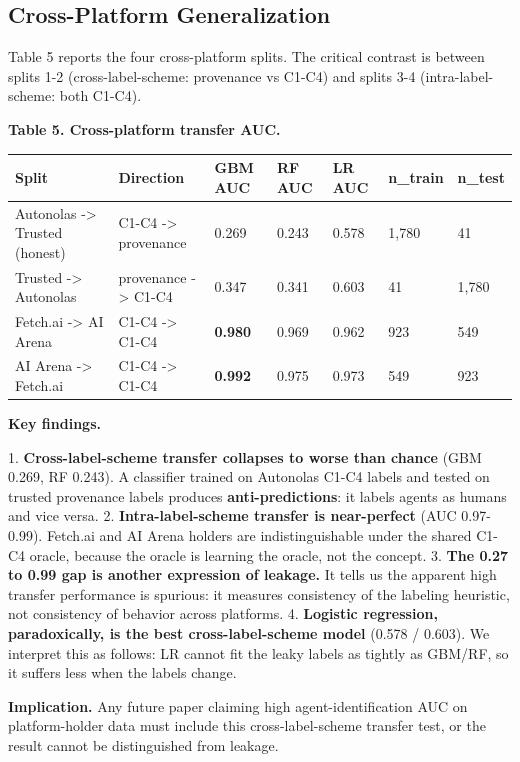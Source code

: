 \documentclass[sigconf,nonacm=false]{acmart}
\begin{document}
\subsection{Cross-Platform Generalization}

Table 5 reports the four cross-platform splits. The critical contrast is between splits 1-2 (cross-label-scheme: provenance vs C1-C4) and splits 3-4 (intra-label-scheme: both C1-C4).

\textbf{Table 5. Cross-platform transfer AUC.}

\begin{table}[h]
\centering
\small
\begin{tabular}{lllllll}
\toprule
Split & Direction & GBM AUC & RF AUC & LR AUC & n\_train & n\_test \\
\midrule
Autonolas -> Trusted (honest) & C1-C4 -> provenance & 0.269 & 0.243 & 0.578 & 1,780 & 41 \\
Trusted -> Autonolas & provenance -> C1-C4 & 0.347 & 0.341 & 0.603 & 41 & 1,780 \\
Fetch.ai -> AI Arena & C1-C4 -> C1-C4 & \textbf{0.980} & 0.969 & 0.962 & 923 & 549 \\
AI Arena -> Fetch.ai & C1-C4 -> C1-C4 & \textbf{0.992} & 0.975 & 0.973 & 549 & 923 \\
\bottomrule
\end{tabular}
\end{table}

\textbf{Key findings.}

1. \textbf{Cross-label-scheme transfer collapses to worse than chance} (GBM 0.269, RF 0.243). A classifier trained on Autonolas C1-C4 labels and tested on trusted provenance labels produces \textbf{anti-predictions}: it labels agents as humans and vice versa.
2. \textbf{Intra-label-scheme transfer is near-perfect} (AUC 0.97-0.99). Fetch.ai and AI Arena holders are indistinguishable under the shared C1-C4 oracle, because the oracle is learning the oracle, not the concept.
3. \textbf{The 0.27 to 0.99 gap is another expression of leakage.} It tells us the apparent high transfer performance is spurious: it measures consistency of the labeling heuristic, not consistency of behavior across platforms.
4. \textbf{Logistic regression, paradoxically, is the best cross-label-scheme model} (0.578 / 0.603). We interpret this as follows: LR cannot fit the leaky labels as tightly as GBM/RF, so it suffers less when the labels change.

\textbf{Implication.} Any future paper claiming high agent-identification AUC on platform-holder data must include this cross-label-scheme transfer test, or the result cannot be distinguished from leakage.
\end{document}
